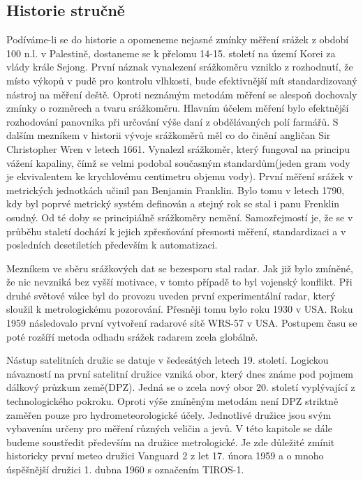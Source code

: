 \documentclass[a4paper,12pt]{article}
\begin{document}
\subsection{Historie stručně}
Podíváme-li se do historie a opomeneme nejasné zmínky měření srážek z období 100 n.l. v Palestině, dostaneme se k přelomu 14-15. století na území Korei za vlády krále Sejong.\cite{sejong} První náznak vynalezení srážkoměru vzniklo z rozhodnutí, že místo výkopů v pudě pro kontrolu vlhkosti, bude efektivnější mít standardizovaný nástroj na měření deště. Oproti neznámým metodám měření se alespoň dochovaly zmínky o rozměrech a tvaru srážkoměru. Hlavním účelem měření bylo efektnější rozhodování panovníka při určování výše daní z obdělávaných polí farmářů. S dalším mezníkem v historii vývoje srážkoměrů měl co do činění angličan Sir Christopher Wren v letech 1661.\cite{wren} Vynalezl srážkoměr, který fungoval na principu vážení kapaliny, čímž se velmi podobal současným standardům(jeden gram vody je ekvivalentem ke krychlovému centimetru objemu vody). První měření srážek v metrických jednotkách učinil pan Benjamin Franklin. Bylo tomu v letech 1790, kdy byl poprvé metrický systém definován a stejný rok se stal i panu Frenklin osudný. Od té doby se principiálně srážkoměry nemění. Samozřejmostí je, že se v průběhu staletí dochází k jejich  zpřesňování přesnosti měření, standardizaci a v posledních desetiletích především k automatizaci.

Mezníkem ve sběru srážkových dat se bezesporu stal radar. Jak již bylo zmíněné, že nic nevzniká bez vyšší motivace, v tomto případě to byl vojenský konflikt. Při druhé světové válce byl do provozu uveden první experimentální radar, který sloužil k metrologickému pozorování. Přesněji tomu bylo roku 1930 v USA. \cite{flash_floods} Roku 1959 následovalo první vytvoření radarové sítě WRS-57 v USA. Postupem času se poté rozšíří metoda odhadu srážek radarem zcela globálně. 

Nástup satelitních družic se datuje v šedesátých letech 19. století. Logickou návazností na první satelitní družice vzniká obor, který dnes známe pod pojmem dálkový průzkum země(DPZ). Jedná se o zcela nový obor 20. století vyplývající z technologického pokroku. Oproti výše zmíněným metodám není DPZ striktně zaměřen pouze pro hydrometeorologické účely. Jednotlivé družice jsou svým vybavením určeny pro měření různých veličin a jevů. V této kapitole se dále budeme soustředit především na družice metrologické. Je zde důležité zmínit historicky první meteo družici Vanguard 2 z let 17. února 1959\cite{vanguard} a o mnoho úspěšnější družici 1. dubna 1960 s označením TIROS-1.
     
\end{document}
